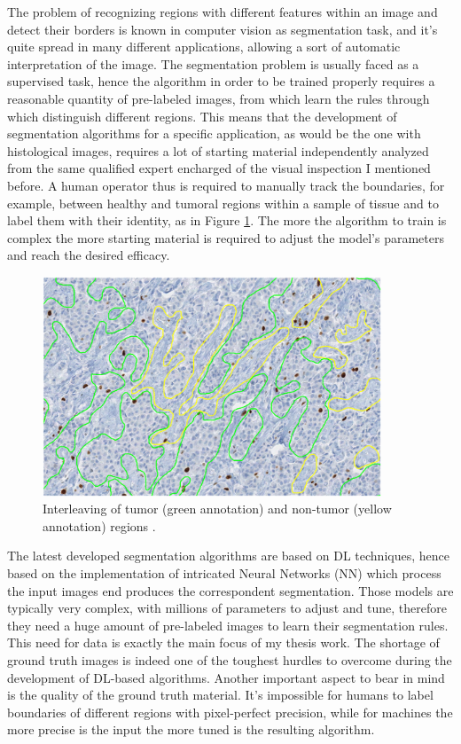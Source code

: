 The problem of recognizing regions with different features within an image and detect their borders is known in computer vision as segmentation task, and it's quite spread in many different applications, allowing a sort of automatic interpretation of the image. The segmentation problem is usually faced as a supervised task, hence the algorithm in order to be trained properly requires a reasonable quantity of pre-labeled images, from which learn the rules through which distinguish different regions. This means that the development of segmentation algorithms for a specific application, as would be the one with histological images, requires a lot of starting material independently analyzed from the same qualified expert encharged of the visual inspection I mentioned before. A human operator thus is required to manually track the boundaries, for example, between healthy and tumoral regions within a sample of tissue and to label them with their identity, as in Figure \ref{fig:man_seg}. The more the algorithm to train is complex the more starting material is required to adjust the model's parameters and reach the desired efficacy.

\begin{figure}
    \centering
    \includegraphics[width = 0.9\textwidth]{images/manual_seg}
    \caption{Interleaving of tumor (green annotation) and non-tumor (yellow annotation) regions \cite{Ki67}.}
    \label{fig:man_seg}
\end{figure}


The latest developed segmentation algorithms are based on DL techniques, hence based on the implementation of intricated Neural Networks (NN) which process the input images end produces the correspondent segmentation. Those models are typically very complex, with millions of parameters to adjust and tune, therefore they need a huge amount of pre-labeled images to learn their segmentation rules. This need for data is exactly the main focus of my thesis work. The shortage of ground truth images is indeed one of the toughest hurdles to overcome during the development of DL-based algorithms. Another important aspect to bear in mind is the quality of the ground truth material. It's impossible for humans to label boundaries of different regions with pixel-perfect precision, while for machines the more precise is the input the more tuned is the resulting algorithm.


